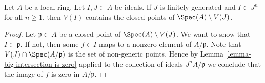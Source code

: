 \begin{lemma}
\label{lemma-closed-points-complement}
Let $A$ be a local ring. Let $I, J \subset A$ be ideals.
If $J$ is finitely generated and $I \subset J^n$ for all $n \geq 1$,
then $V(I)$ contains the closed points of $\Spec(A) \setminus V(J)$.
\end{lemma}

\begin{proof}
Let $\mathfrak p \subset A$ be a closed point of $\Spec(A) \setminus V(J)$.
We want to show that $I \subset \mathfrak p$. If not, then some $f \in I$
maps to a nonzero element of $A/\mathfrak p$. Note that
$V(J) \cap \Spec(A/\mathfrak p)$ is the set of non-generic points.
Hence by Lemma \ref{lemma-big-intersection-is-zero} applied
to the collection of ideals $J^nA/\mathfrak p$ we conclude that
the image of $f$ is zero in $A/\mathfrak p$.
\end{proof}
